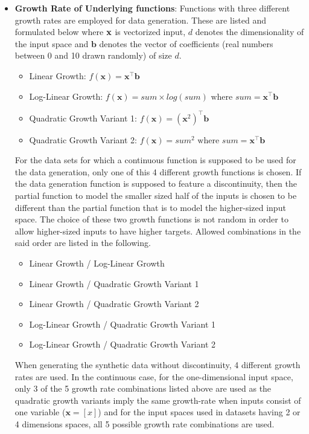 \begin{itemize}
\item \textbf{Growth Rate of Underlying functions}: Functions with three different growth rates are employed for data generation. These are listed and formulated below where $\bf{x}$ is vectorized input, $d$ denotes the dimensionality of the input space and $\pmb{b}$ denotes the vector of coefficients (real numbers between 0 and 10 drawn randomly) of size $d$.
\begin{itemize}
\item Linear Growth: $f(\pmb{x}) = \pmb{x}^{\top}\pmb{b}$
\item Log-Linear Growth: $f(\pmb{x}) = sum\times log(sum) \text{ where } sum = \pmb{x}^{\top}\pmb{b}$
\item Quadratic Growth Variant 1: $f(\pmb{x}) = (\pmb{x}^2)^{\top}\pmb{b}$
\item Quadratic Growth Variant 2: $f(\pmb{x}) = sum^2 \text{ where } sum = \pmb{x}^{\top}\pmb{b}$
\end{itemize}

For the data sets for which a continuous function is supposed to be used for the data generation, only one of this 4 different growth functions is chosen. If the data generation function is supposed to feature a discontinuity, then the partial function to model the smaller sized half of the inputs is chosen to be different than the partial function that is to model the higher-sized input space. The choice of these two growth functions is not random in order to allow higher-sized inputs to have higher targets. Allowed combinations in the said order are listed in the following.
\begin{itemize}
\item Linear Growth / Log-Linear Growth
\item Linear Growth / Quadratic Growth Variant 1
\item Linear Growth / Quadratic Growth Variant 2
\item Log-Linear Growth / Quadratic Growth Variant 1
\item Log-Linear Growth / Quadratic Growth Variant 2
\end{itemize}

When generating the synthetic data without discontinuity, 4 different growth rates are used. In the continuous case, for the one-dimensional input space, only 3 of the 5 growth rate combinations listed above are used as the quadratic growth variants imply the same growth-rate when inputs consist of one variable ($\pmb{x} = [x]$) and for the input spaces used in datasets having 2 or 4 dimensions spaces, all 5 possible growth rate combinations are used.


\end{itemize}
